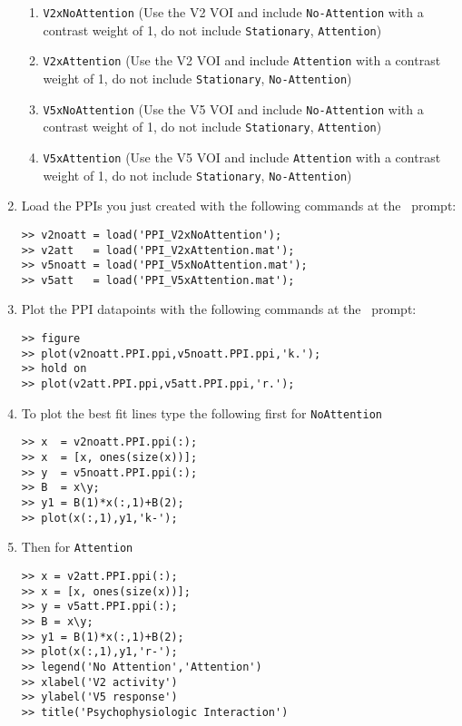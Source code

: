 \begin{enumerate}
\begin{enumerate}
\item \texttt{V2xNoAttention} (Use the V2 VOI and include \texttt{No-Attention} with a contrast weight of 1, do not include \texttt{Stationary}, \texttt{Attention})
\item \texttt{V2xAttention} (Use the V2 VOI and include \texttt{Attention} with a contrast weight of 1, do not include \texttt{Stationary}, \texttt{No-Attention})
\item \texttt{V5xNoAttention} (Use the V5 VOI and include \texttt{No-Attention} with a contrast weight of 1, do not include \texttt{Stationary}, \texttt{Attention})
\item \texttt{V5xAttention} (Use the V5 VOI and include \texttt{Attention} with a contrast weight of 1, do not include \texttt{Stationary}, \texttt{No-Attention})
\end{enumerate}
\item Load the PPIs you just created with the following commands at the \matlab\ prompt:
\begin{verbatim}
>> v2noatt = load('PPI_V2xNoAttention');
>> v2att   = load('PPI_V2xAttention.mat');
>> v5noatt = load('PPI_V5xNoAttention.mat');
>> v5att   = load('PPI_V5xAttention.mat');
\end{verbatim}
\item Plot the PPI datapoints with the following commands at the \matlab\ prompt:
\begin{verbatim}
>> figure
>> plot(v2noatt.PPI.ppi,v5noatt.PPI.ppi,'k.');
>> hold on
>> plot(v2att.PPI.ppi,v5att.PPI.ppi,'r.');
\end{verbatim}
\item To plot the best fit lines type the following first for \texttt{NoAttention}
\begin{verbatim}
>> x  = v2noatt.PPI.ppi(:);
>> x  = [x, ones(size(x))];
>> y  = v5noatt.PPI.ppi(:);
>> B  = x\y;
>> y1 = B(1)*x(:,1)+B(2);
>> plot(x(:,1),y1,'k-');
\end{verbatim}
\item Then for \texttt{Attention}
\begin{verbatim}
>> x = v2att.PPI.ppi(:);
>> x = [x, ones(size(x))];
>> y = v5att.PPI.ppi(:);
>> B = x\y;
>> y1 = B(1)*x(:,1)+B(2);
>> plot(x(:,1),y1,'r-');
>> legend('No Attention','Attention')
>> xlabel('V2 activity')
>> ylabel('V5 response')
>> title('Psychophysiologic Interaction')
\end{verbatim}
\end{enumerate}

\begin{figure}[!ht]
\centering{}
\caption{\em }
\label{ppi_fig12}
\end{figure}